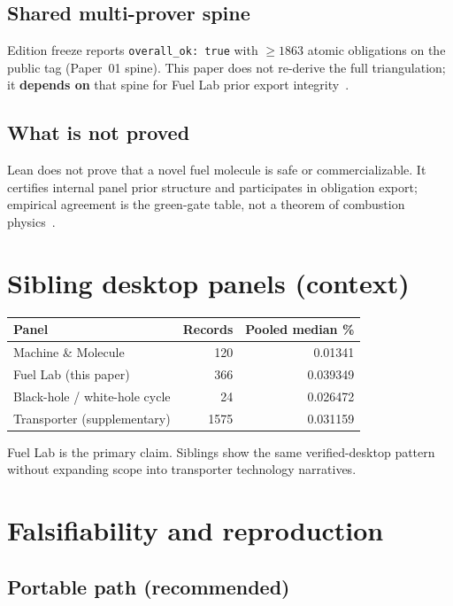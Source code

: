 \documentclass[11pt,a4paper]{article}
\begin{document}
\subsection{Shared multi-prover spine}

Edition freeze reports \mbox{\texttt{overall\_ok: true}} with
$\ge 1863$ atomic obligations on the public tag (Paper~01 spine).
This paper does not re-derive the full triangulation; it \textbf{depends on}
that spine for Fuel Lab prior export integrity~\cite{FSOTPaper01}.

\subsection{What is not proved}

Lean does not prove that a novel fuel molecule is safe or commercializable.
It certifies internal panel prior structure and participates in obligation
export; empirical agreement is the green-gate table, not a theorem of
combustion physics~\cite{Bobbin2024}.

\section{Sibling desktop panels (context)}
\label{sec:siblings}

\begin{center}
\begin{tabular}{@{}lrr@{}}
\toprule
Panel & Records & Pooled median \% \\
\midrule
Machine \& Molecule & 120 & 0.01341 \\
Fuel Lab (this paper) & 366 & 0.039349 \\
Black-hole / white-hole cycle & 24 & 0.026472 \\
Transporter (supplementary) & 1575 & 0.031159 \\
\bottomrule
\end{tabular}
\end{center}

Fuel Lab is the primary claim.
Siblings show the same verified-desktop pattern without expanding scope into
transporter technology narratives.

\section{Falsifiability and reproduction}
\label{sec:repro}

\subsection{Portable path (recommended)}
\end{document}
